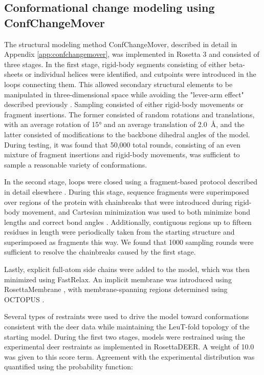 \subsection{Conformational change modeling using ConfChangeMover}

The structural modeling method ConfChangeMover, described in detail in Appendix \ref{app:confchangemover}, was implemented in Rosetta 3 \citep*{Leaver-fay2011, Leman2020} and consisted of three stages. In the first stage, rigid-body segments consisting of either beta-sheets or individual helices were identified, and cutpoints were introduced in the loops connecting them. This allowed secondary structural elements to be manipulated in three-dimensional space while avoiding the "lever-arm effect" described previously \citep*{Tyka2012}. Sampling consisted of either rigid-body movements or fragment insertions. The former consisted of random rotations and translations, with an average rotation of 15° and an average translation of \SI{2.0}{\angstrom}, and the latter consisted of modifications to the backbone dihedral angles of the model. During testing, it was found that 50,000 total rounds, consisting of an even mixture of fragment insertions and rigid-body movements, was sufficient to sample a reasonable variety of conformations.

In the second stage, loops were closed using a fragment-based protocol described in detail elsewhere \citep*{Song2013}. During this stage, sequence fragments were superimposed over regions of the protein with chainbreaks that were introduced during rigid-body movement, and Cartesian minimization was used to both minimize bond lengths and correct bond angles \citep*{Rohl2004}. Additionally, contiguous regions up to fifteen residues in length were periodically taken from the starting structure and superimposed as fragments this way. We found that 1000 sampling rounds were sufficient to resolve the chainbreaks caused by the first stage.

Lastly, explicit full-atom side chains were added to the model, which was then minimized using FastRelax. An implicit membrane was introduced using RosettaMembrane \citep*{Yarov-Yarovoy2006}, with membrane-spanning regions determined using OCTOPUS \citep*{Viklund2008}.

Several types of restraints were used to drive the model toward conformations consistent with the \gls{deer} data while maintaining the LeuT-fold topology of the starting model. During the first two stages, models were restrained using the experimental \gls{deer} restraints as implemented in RosettaDEER. A weight of 10.0 was given to this score term. Agreement with the experimental distribution was quantified using the probability function:

